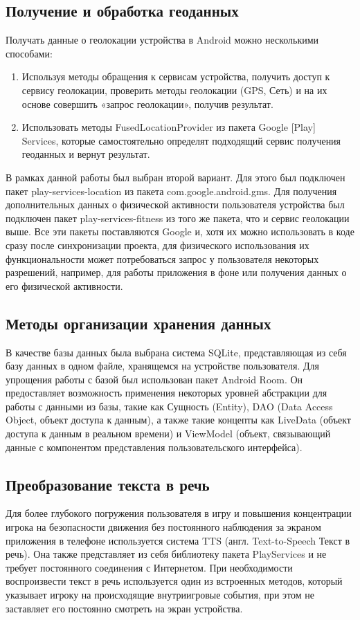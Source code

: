 \subsection{Получение и обработка геоданных}
Получать данные о геолокации устройства в Android можно несколькими способами:
\begin{enumerate}
	\item Используя методы обращения к сервисам устройства, получить доступ к сервису геолокации, проверить методы геолокации (GPS, Сеть) и на их основе совершить «запрос геолокации», получив результат.
	\item Использовать методы FusedLocationProvider из пакета Google [Play] Services, которые самостоятельно определят подходящий сервис получения геоданных и вернут результат.
\end{enumerate}

В рамках данной работы был выбран второй вариант. Для этого был подключен пакет play-services-location из пакета com.google.android.gms.
Для получения дополнительных данных о физической активности пользователя устройства был подключен пакет play-services-fitness из того же пакета, что и сервис геолокации выше.
Все эти пакеты поставляются Google и, хотя их можно использовать в коде сразу после синхронизации проекта, для физического использования их функциональности может потребоваться запрос у пользователя некоторых разрешений, например, для работы приложения в фоне или получения данных о его физической активности.


\subsection{Методы организации хранения данных}
В качестве базы данных была выбрана система SQLite, представляющая из себя базу данных в одном файле, хранящемся на устройстве пользователя.
Для упрощения работы с базой был использован пакет Android Room. Он предоставляет возможность применения некоторых уровней абстракции для работы с данными из базы, такие как Сущность (Entity), DAO (Data Access Object, объект доступа к данным), а также такие концепты как LiveData (объект доступа к данным в реальном времени) и ViewModel (объект, связывающий данные с компонентом представления пользовательского интерфейса).


\subsection{Преобразование текста в речь}
Для более глубокого погружения пользователя в игру и повышения концентрации игрока на безопасности движения без постоянного наблюдения за экраном приложения в телефоне используется система TTS (англ. Text-to-Speech \textemdash\space Текст в речь). Она также представляет из себя библиотеку пакета PlayServices и не требует постоянного соединения с Интернетом. 
При необходимости воспроизвести текст в речь используется один из встроенных методов, который указывает игроку на происходящие внутриигровые события, при этом не заставляет его постоянно смотреть на экран устройства.


